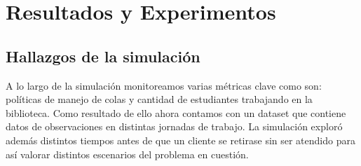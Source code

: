 \documentclass[10pt,twocolumn]{article}
\begin{document}
\section{Resultados y Experimentos}
\subsection{Hallazgos de la simulación}
A lo largo de la simulación monitoreamos varias métricas clave como son: políticas de manejo de colas y cantidad de estudiantes trabajando en la biblioteca. Como resultado de ello ahora contamos con un dataset que contiene datos de observaciones en distintas jornadas de trabajo. La simulación exploró además distintos tiempos antes de que un cliente se retirase sin ser atendido para así valorar distintos escenarios del problema en cuestión.
\end{document}
